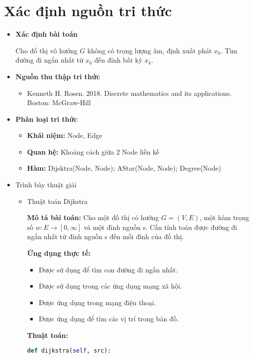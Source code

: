 \section{Xác định nguồn tri thức} 

\begin{itemize}
	\item \textbf{Xác định bài toán}
	
	Cho đồ thị vô hướng $G$ không có trọng lượng âm, định xuất phát $x_0$. Tìm đường đi ngắn nhất từ $x_0$ đến đỉnh bất kỳ $x_k$.

	
	\item \textbf{Nguồn thu thập tri thức}
	\begin{itemize}
		\item Kenneth H. Rosen. 2018. Discrete mathematics and its applications. Boston: McGraw-Hill
	\end{itemize}
	
	\item \textbf{Phân loại tri thức}
	\begin{itemize}
		\item \textbf{Khái niệm: } Node, Edge
		\item \textbf{Quan hệ: } Khoảng cách giữa 2 Node liền kề
		\item \textbf{Hàm: } Dijsktra(Node, Node); AStar(Node, Node); Degree(Node)
	\end{itemize}
	\item Trình bày thuật giải
	\begin{itemize}
		\item Thuật toán Dijkstra
		
		\textbf{Mô tả bài toán:} Cho một đồ thị có hướng $G=(V,E)$, một hàm trọng số $w: E \rightarrow [0,\infty]$ và một đỉnh nguồn s. Cần tính toán được đường đi ngắn nhất từ đỉnh nguồn s đến mỗi đỉnh của đồ thị.
		
		\textbf{Ứng dụng thực tế:}
		\begin{itemize}
			\item Được sử dụng để tìm con đường đi ngắn nhất.
			\item Được sử dụng trong các ứng dụng mạng xã hội.
			\item Được ứng dụng trong mạng điện thoại.
			\item Được ứng dụng để tìm các vị trí trong bản đồ.
		\end{itemize}
	
	
		\textbf{Thuật toán:}
		\begin{lstlisting}[language=Python, caption=Mã giải của thuật toán Dijkstra]
			def dijkstra(self, src):
			

\end{lstlisting}
\end{itemize}
\end{itemize}
